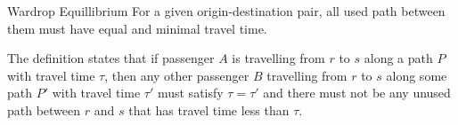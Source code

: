 \begin{definition}{Wardrop Equillibrium}
For a given origin-destination pair, all used path between
them must have equal and minimal travel time.
\end{definition}

The definition states that if passenger $A$ is travelling from
$r$ to $s$ along a path $P$ with travel time $\tau$, then any
other passenger $B$ travelling from $r$ to $s$ along some path $P'$
with travel time $\tau'$ must satisfy $\tau=\tau'$ and there must
not be any unused path between $r$ and $s$ that has travel time less
than $\tau$.
